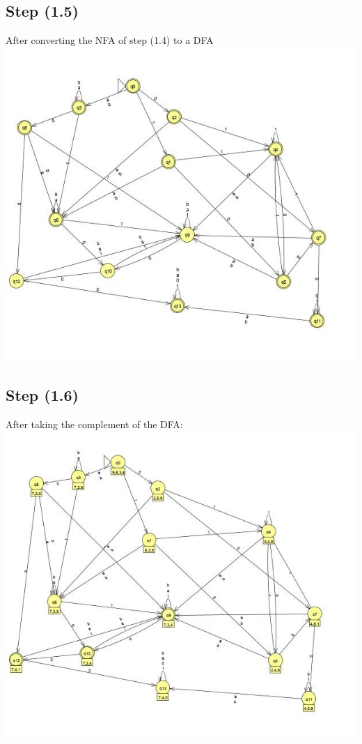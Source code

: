 \documentclass{article}
\theoremstyle{remark}
\numberwithin{equation}{section}
\begin{document}
	\subsection*{Step (1.5)}
	After converting the NFA of step (1.4) to a DFA\\
	\includegraphics[width=\columnwidth]{E_DFATV.jpg}\\
	\subsection*{Step (1.6)}
	After taking the complement of the DFA: \\
	\includegraphics[width=\columnwidth]{E_cDFATV.jpg}\\
\end{document}
